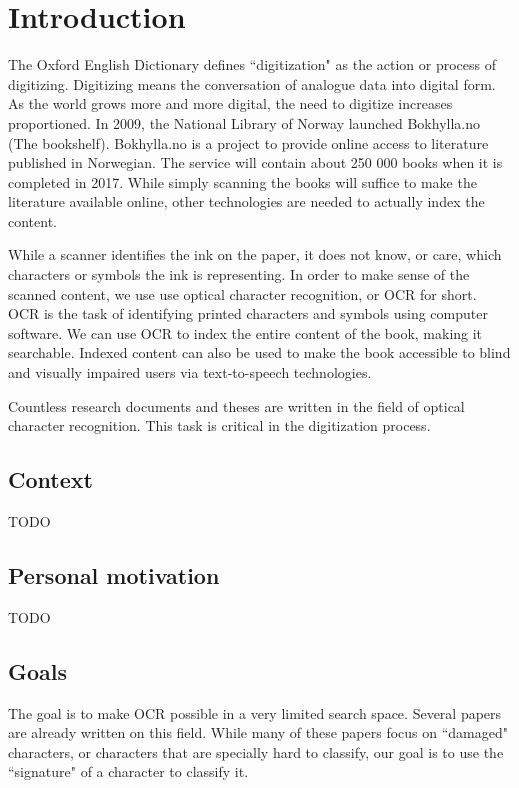 
\chapter{Introduction}
The Oxford English Dictionary defines ``digitization" as the action or process of digitizing. Digitizing means the conversation of analogue data into digital form\cite{misc-oed-digitization}. As the world grows more and more digital, the need to digitize increases proportioned. In 2009, the National Library of Norway launched Bokhylla.no (The bookshelf). Bokhylla.no is a project to provide online access to literature published in Norwegian. The service will contain about 250 000 books when it is completed in 2017\cite{misc-nb-digial-library}. While simply scanning the books will suffice to make the literature available online, other technologies are needed to actually index the content.

While a scanner identifies the ink on the paper, it does not know, or care, which characters or symbols the ink is representing. In order to make sense of the scanned content, we use use optical character recognition, or OCR for short. OCR is the task of identifying printed characters and symbols using computer software. We can use OCR to index the entire content of the book, making it searchable. Indexed content can also be used to make the book accessible to blind and visually impaired users via text-to-speech technologies.

Countless research documents and theses are written in the field of optical character recognition. This task is critical in the digitization process.

\section{Context}
TODO

\section{Personal motivation}
TODO

\section{Goals}
The goal is to make OCR possible in a very limited search space. Several papers are already written on this field. While many of these papers focus on ``damaged" characters, or characters that are specially hard to classify, our goal is to use the ``signature" of a character to classify it.

